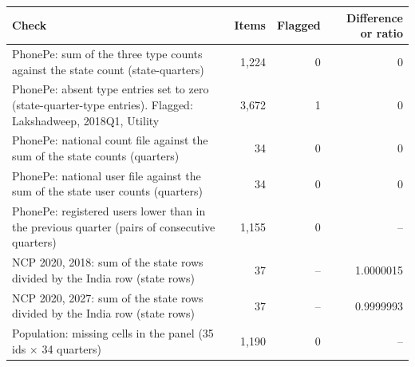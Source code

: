 \begin{tabular}{@{}>{\raggedright\arraybackslash}p{9.2cm} r r r@{}}
\toprule
Check & Items & Flagged & Difference or ratio \\
\midrule
PhonePe: sum of the three type counts against the state count (state-quarters) & 1{,}224 & 0 & 0 \\
PhonePe: absent type entries set to zero (state-quarter-type entries). Flagged: Lakshadweep, 2018Q1, Utility & 3{,}672 & 1 & 0 \\
PhonePe: national count file against the sum of the state counts (quarters) & 34 & 0 & 0 \\
PhonePe: national user file against the sum of the state user counts (quarters) & 34 & 0 & 0 \\
PhonePe: registered users lower than in the previous quarter (pairs of consecutive quarters) & 1{,}155 & 0 & -- \\
NCP 2020, 2018: sum of the state rows divided by the India row (state rows) & 37 & -- & 1.0000015 \\
NCP 2020, 2027: sum of the state rows divided by the India row (state rows) & 37 & -- & 0.9999993 \\
Population: missing cells in the panel (35 ids $\times$ 34 quarters) & 1{,}190 & 0 & -- \\
\bottomrule
\end{tabular}
